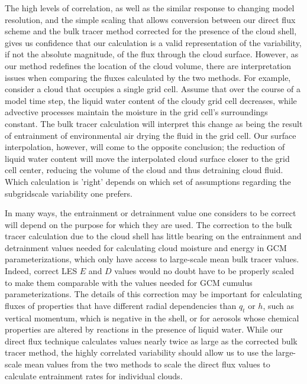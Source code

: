 \documentclass[12pt]{article}
\begin{document}
The high levels of correlation, as well as the similar response to changing 
model resolution, and the simple scaling that allows conversion between our 
direct flux scheme and the bulk tracer method corrected for the presence of the 
cloud shell, gives us confidence that our calculation is a valid representation 
of the variability, if not the absolute magnitude, of the flux through the 
cloud surface.  However, as our method redefines the location of the cloud 
volume, there are interpretation issues when comparing the fluxes calculated by 
the two methods.  For example, consider a cloud that occupies a single grid 
cell.  Assume that over the course of a model time step, the liquid water 
content of the cloudy grid cell decreases, while advective processes maintain 
the moisture in the grid cell's surroundings constant.  The bulk tracer 
calculation will interpret this change as being the result of entrainment of 
environmental air drying the fluid in the grid cell.  Our surface 
interpolation, however, will come to the opposite conclusion; the reduction of 
liquid water content will move the interpolated cloud surface closer to the 
grid cell center, reducing the volume of the cloud and thus detraining cloud 
fluid.  Which calculation is 'right' depends on which set of assumptions 
regarding the subgridscale variability one prefers.

In many ways, the entrainment or detrainment value one considers to be correct 
will depend on the purpose for which they are used.  The correction to the bulk 
tracer calculation due to the cloud shell has little bearing on the entrainment 
and detrainment values needed for calculating cloud moisture and energy in GCM 
parameterizations, which only have access to large-scale mean bulk tracer 
values.  Indeed, correct LES $E$ and $D$ values would no doubt have to be 
properly scaled to make them comparable with the values needed for GCM cumulus 
parameterizations.  The details of this correction may be important for 
calculating fluxes of properties that have different radial dependencies than 
$q_t$ or $h$, such as vertical momentum, which is negative in the shell, or for 
aerosols whose chemical properties are altered by reactions in the presence of 
liquid water.  While our direct flux technique calculates values nearly twice 
as large as the corrected bulk tracer method, the highly correlated variability 
should allow us to use the large-scale mean values from the two methods to scale
the direct flux values to calculate entrainment rates for individual clouds.
\end{document}
